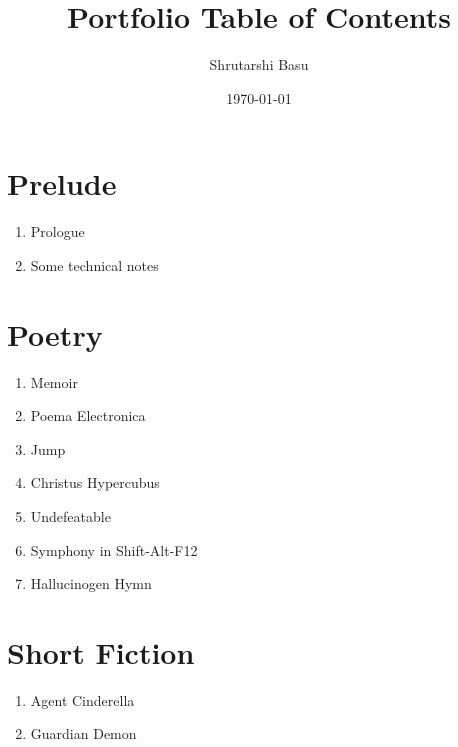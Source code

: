 \documentclass[12pt,letterpaper]{article}
\title{Portfolio Table of Contents}
\author{Shrutarshi Basu}
\date{\today}
\begin{document}
\maketitle

\section*{Prelude}
\begin{enumerate}

\item Prologue
\item Some technical notes

\end{enumerate}

\section*{Poetry}

\begin{enumerate}

\item Memoir
\item Poema Electronica
\item Jump
\item Christus Hypercubus
\item Undefeatable
\item Symphony in Shift-Alt-F12
\item Hallucinogen Hymn

\end{enumerate}

\section*{Short Fiction}

\begin{enumerate}

\item Agent Cinderella
\item Guardian Demon

\end{enumerate}
\end{document}
